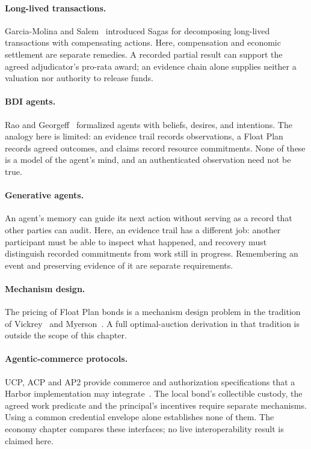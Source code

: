 \documentclass[11pt,a4paper]{article}
\theoremstyle{definition}
\theoremstyle{remark}
\begin{document}
\paragraph{Long-lived transactions.} Garcia-Molina and Salem~ introduced Sagas for decomposing long-lived transactions with compensating actions. Here, compensation and economic settlement are separate remedies. A recorded partial result can support the agreed adjudicator's pro-rata award; an evidence chain alone supplies neither a valuation nor authority to release funds.

\paragraph{BDI agents.} Rao and Georgeff~ formalized agents with beliefs, desires, and intentions. The analogy here is limited: an evidence trail records observations, a Float Plan records agreed outcomes, and claims record resource commitments. None of these is a model of the agent's mind, and an authenticated observation need not be true.

\paragraph{Generative agents.} An agent's memory can guide its next action
without serving as a record that other parties can audit.
Here, an evidence trail has a different job: another participant must be able
to inspect what happened, and recovery must distinguish recorded commitments
from work still in progress. Remembering an event and preserving evidence of
it are separate requirements.

\paragraph{Mechanism design.} The pricing of Float Plan bonds is a mechanism design problem in the tradition of Vickrey~ and Myerson~. A full optimal-auction derivation in that tradition is outside the scope of this chapter.

\paragraph{Agentic-commerce protocols.}
UCP, ACP and AP2 provide commerce and authorization specifications that a
Harbor implementation may integrate~.
The local bond's collectible custody, the agreed work predicate and the
principal's incentives require separate mechanisms. Using a common
credential envelope alone establishes none of them. The economy chapter
compares these interfaces; no live interoperability result is claimed here.
\end{document}

